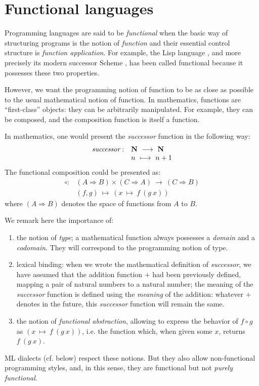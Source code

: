\def\Nat{{\bf N}}

\chapter{Functional languages}
\label{c:gen}

Programming languages are said to be {\em functional} when the basic
way of structuring programs is the notion of {\em function} and their
essential control structure is {\em function application}.  For
example, the Lisp language \cite{MacCarthy}, and more precisely its
modern successor Scheme \cite{SchemeReport,AbelsonSussman}, has been called
functional because it possesses these two properties.

However, we want the programming notion of function to be as close
as possible to the usual mathematical notion of function. In
mathematics, functions are ``first-class'' objects: they can be
arbitrarily manipulated. For example, they can be composed, and the
composition function is itself a function.

In mathematics, one would present the {\em successor} function in the
following way:
\[\begin{array}{ll}
\mbox{\em successor} : & \Nat ~ \longrightarrow ~ \Nat \\
                       & n ~ \longmapsto ~ n+1
\end{array}
\]
The functional composition could be presented as:
\[\begin{array}{ll}
\circ : & (A \Rightarrow B) \times (C \Rightarrow A)
                        ~ \longrightarrow ~ (C \Rightarrow B) \\
               & (f,g) ~ \longmapsto ~ (x~\longmapsto~f~(g~x))
\end{array}
\]
where $(A \Rightarrow B)$ denotes the space of functions from $A$ to $B$.

We remark here the importance of:
\begin{enumerate}
\item the notion of {\em type}; a mathematical function always possesses a
{\em domain} and a {\em codomain}. They will correspond to the programming
notion of type.
\item lexical binding: when we wrote the mathematical definition of
{\em successor}, we have assumed that the addition function $+$ had been
previously defined, mapping a pair of natural numbers to a natural
number; the meaning of the {\em successor} function is defined using
the {\em meaning} of the addition: whatever $+$ denotes in the future,
this {\em successor} function will remain the same.
\item the notion of {\em functional abstraction}, allowing to express
the behavior of $f \circ g$ as $(x~\longmapsto~f~(g~x))$, i.e.
the function which, when given some $x$, returns $f~(g~x)$.
\end{enumerate}
ML dialects (cf. below) respect these notions. But they also allow
non-functional programming styles, and, in this sense, they are
functional but not {\em purely functional}.

